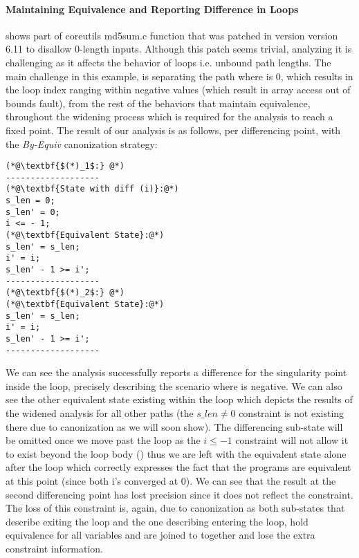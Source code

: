 \paragraph{Maintaining Equivalence and Reporting Difference in Loops}
 shows part of coreutils md5sum.c  function that was patched in version version 6.11 to disallow 0-length inputs. Although this patch seems trivial, analyzing it is challenging as it affects the behavior of loops i.e. unbound path lengths. The main challenge in this example, is separating the path where  is 0, which results in the loop index  ranging within negative values (which result in array access out of bounds fault), from the rest of the behaviors that maintain equivalence, throughout the widening process which is required for the analysis to reach a fixed point. The result of our analysis is as follows, per differencing point, with the \emph{By-Equiv} canonization strategy:
\begin{lstlisting}
(*@\textbf{$(*)_1$:} @*)
-------------------
(*@\textbf{State with diff (i)}:@*)
s_len = 0;
s_len' = 0;
i <= - 1;
(*@\textbf{Equivalent State}:@*)
s_len' = s_len;
i' = i;
s_len' - 1 >= i';
-------------------
(*@\textbf{$(*)_2$:} @*)
(*@\textbf{Equivalent State}:@*)
s_len' = s_len;
i' = i;
s_len' - 1 >= i';
-------------------
\end{lstlisting}
We can see the analysis successfully reports a difference for the singularity point  inside the loop, precisely describing the scenario where  is negative. We can also see the other equivalent state existing within the loop which depicts the results of the widened analysis for all other paths (the $s\_len \neq 0$ constraint is not existing there due to canonization as we will soon show). The differencing sub-state will be omitted once we move past the loop as the $i \leq -1$ constraint will not allow it to exist beyond the loop body () thus we are left with the equivalent state alone after the loop which correctly expresses the fact that the programs are equivalent at this point (since both i's converged at 0). We can see that the result at the second differencing point has lost precision since it does not reflect the  constraint. The loss of this constraint is, again, due to canonization as both sub-states that describe exiting the loop and the one describing entering the loop, hold equivalence for all variables and are joined to together and lose the extra constraint information.
